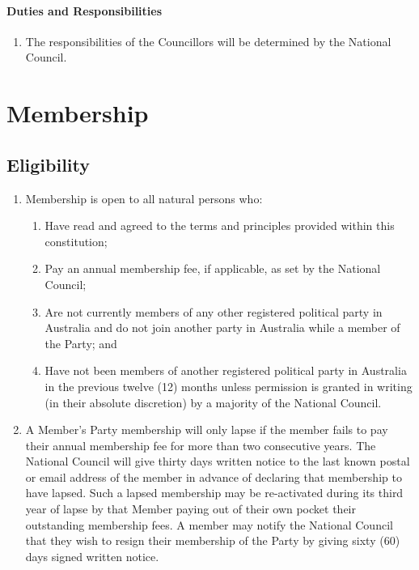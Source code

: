 \documentclass[a4paper,titlepage,8.5pt]{article}
\begin{document}
\paragraph{Duties and Responsibilities}

\begin{enumerate}
\item The responsibilities of the Councillors will be determined by the National Council.
\end{enumerate}

\section{Membership}

\subsection{Eligibility}

\begin{enumerate}
\item Membership is open to all natural persons who:
\begin{enumerate}
\item Have read and agreed to the terms and principles provided within this constitution;
\item Pay an annual membership fee, if applicable, as set by the National Council;
\item Are not currently members of any other registered political party in Australia and do not join another party in Australia while a member of the Party; and
\item Have not been members of another registered political party in Australia in the previous twelve (12) months unless permission is granted in writing (in their absolute discretion) by a majority of the National Council.
\end{enumerate}
\item A Member's Party membership will only lapse if the member fails to pay their annual membership fee for more than two consecutive years. The National Council will give thirty days written notice to the last known postal or email address of the member in advance of declaring that membership to have lapsed. Such a lapsed membership may be re-activated during its third year of lapse by that Member paying out of their own pocket their outstanding membership fees. A member may notify the National Council that they wish to resign their membership of the Party by giving sixty (60) days signed written notice.
\end{enumerate}
\end{document}

